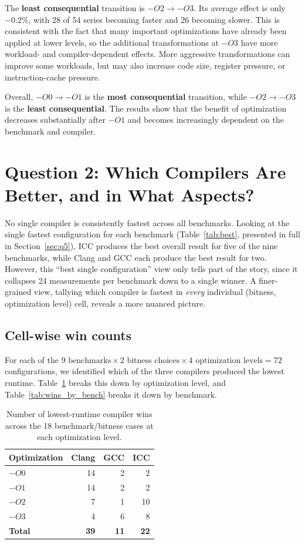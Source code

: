 \documentclass[11pt,a4paper]{article}
\begin{document}
The \textbf{least consequential} transition is $-O2\rightarrow-O3$. Its
average effect is only $-0.2\%$, with 28 of 54 series becoming faster and 26
becoming slower. This is consistent with the fact that many important
optimizations have already been applied at lower levels, so the additional
transformations at $-O3$ have more workload- and compiler-dependent effects.
More aggressive transformations can improve some workloads, but may also
increase code size, register pressure, or instruction-cache pressure.

Overall, $-O0\rightarrow-O1$ is the \textbf{most consequential} transition,
while $-O2\rightarrow-O3$ is the \textbf{least consequential}. The results
show that the benefit of optimization decreases substantially after $-O1$
and becomes increasingly dependent on the benchmark and compiler.


\section{Question 2: Which Compilers Are Better, and in What Aspects?}

No single compiler is consistently fastest across all benchmarks. Looking at the single fastest
configuration for each benchmark (Table~\ref{tab:best}, presented in full in
Section~\ref{sec:q5}), ICC produces the best overall result for five of the nine benchmarks,
while Clang and GCC each produce the best result for two. However, this ``best single
configuration'' view only tells part of the story, since it collapses 24 measurements per
benchmark down to a single winner. A finer-grained view, tallying which compiler is fastest
in \emph{every} individual (bitness, optimization level) cell, reveals a more nuanced picture.

\subsection{Cell-wise win counts}

For each of the $9 \text{ benchmarks} \times 2 \text{ bitness choices} \times 4 \text{ optimization
levels} = 72$ configurations, we identified which of the three compilers produced the lowest
runtime. Table~\ref{tab:wins_by_opt} breaks this down by optimization level, and
Table~\ref{tab:wins_by_bench} breaks it down by benchmark.

\begin{table}[H]
\centering
\caption{Number of lowest-runtime compiler wins across the 18 benchmark/bitness cases at each
optimization level.}
\label{tab:wins_by_opt}
\begin{tabular}{lrrr}
\toprule
Optimization & Clang & GCC & ICC \\
\midrule
$-O0$ & 14 & 2  & 2  \\
$-O1$ & 14 & 2  & 2  \\
$-O2$ & 7  & 1  & 10 \\
$-O3$ & 4  & 6  & 8  \\
\midrule
\textbf{Total} & \textbf{39} & \textbf{11} & \textbf{22} \\
\bottomrule
\end{tabular}
\end{table}
\end{document}

